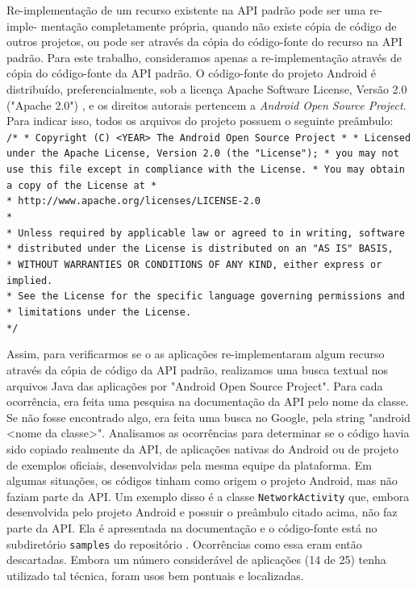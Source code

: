 Re-implementação de um recurso existente na API padrão pode ser uma re-imple- mentação
completamente própria, quando não existe cópia de código de outros projetos, ou pode
ser através da cópia do código-fonte do recurso na API padrão. Para este trabalho,
consideramos apenas a re-implementação através de cópia do código-fonte da API padrão.
O código-fonte do projeto Android é distribuído, preferencialmente, sob a licença Apache 
Software License, Versão 2.0 ("Apache 2.0") \cite{License}, e os direitos autorais
pertencem a \textit{Android Open Source Project}. Para indicar isso, todos os arquivos
do projeto possuem o seguinte preâmbulo:
\texttt{
\newline
/* \newline
 * Copyright (C) <YEAR> The Android Open Source Project \newline
 * \newline
 * Licensed under the Apache License, Version 2.0 (the "License"); \newline
 * you may not use this file except in compliance with the License. \newline
 * You may obtain a copy of the License at \newline
 * \\
 *      http://www.apache.org/licenses/LICENSE-2.0 \\
 * \\
 * Unless required by applicable law or agreed to in writing, software \\
 * distributed under the License is distributed on an "AS IS" BASIS, \\
 * WITHOUT WARRANTIES OR CONDITIONS OF ANY KIND, either express or implied. \\
 * See the License for the specific language governing permissions and \\
 * limitations under the License. \\
 */
} 

Assim, para verificarmos se o as aplicações re-implementaram algum recurso através
da cópia de código da API padrão, realizamos uma busca textual nos arquivos Java
das aplicações por "Android Open Source Project". Para cada ocorrência, era feita
uma pesquisa na documentação da API pelo nome da classe. Se não fosse encontrado
algo, era feita uma busca no Google, pela string "android <nome da classe>".
Analisamos as ocorrências  para determinar se o código havia sido copiado realmente
da API, de aplicações nativas do Android ou de projeto de exemplos oficiais,
desenvolvidas pela mesma equipe da plataforma. Em algumas situações, os códigos
tinham como origem o projeto Android, mas não faziam parte da API. Um exemplo disso
é a classe \texttt{NetworkActivity} que, embora desenvolvida pelo projeto Android e
possuir o preâmbulo citado acima, não faz parte da API. Ela é apresentada na
documentação \cite{NetworkUsage} e o código-fonte está no subdiretório \texttt{samples}
do repositório \cite{NetworkActivity}. Ocorrências como essa eram então descartadas.
Embora um número considerável de aplicações (14 de 25) tenha utilizado tal técnica,
foram usos bem pontuais e localizadas.


